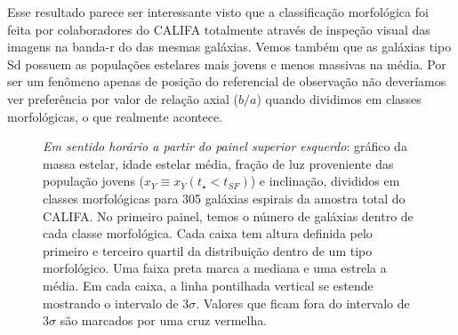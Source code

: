Esse resultado parece ser interessante visto que a classificação morfológica foi feita por
colaboradores do CALIFA totalmente através de inspeção visual das imagens na banda-r do \SDSS das
mesmas galáxias. Vemos também que as galáxias tipo Sd possuem as populações estelares mais jovens e
menos massivas na média. Por ser um fenômeno apenas de posição do referencial de observação não
deveríamos ver preferência por valor de relação axial ($b/a$) quando dividimos em classes
morfológicas, o que realmente acontece.

\begin{figure}
	\centering
	\caption[Classificação por morfologia.]
	{\emph{Em sentido horário a partir do painel superior esquerdo}: gráfico da massa estelar, idade
	estelar média, fração de luz proveniente das população jovens ($x_Y \equiv x_Y(t_\star < t_{SF})$) e
	inclinação, divididos em classes morfológicas para 305 galáxias espirais da amostra total do
	CALIFA. No primeiro painel, temos o número de galáxias dentro de cada classe morfológica. Cada
	caixa tem altura definida pelo primeiro e terceiro quartil da distribuição dentro de um tipo
	morfológico. Uma faixa preta marca a mediana e uma estrela a média. Em cada caixa, a linha
	pontilhada vertical se estende mostrando o intervalo de $3\sigma$. Valores que ficam fora do
	intervalo de $3\sigma$ são marcados por uma cruz vermelha.}
	\label{fig:amostraMorf}
\end{figure}

